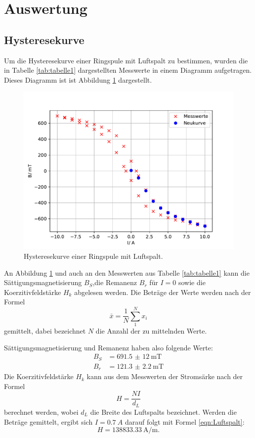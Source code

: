 \section{Auswertung}

\subsection{Hysteresekurve}
Um die Hysteresekurve einer Ringspule mit Luftspalt zu
bestimmen, wurden die in Tabelle \ref{tab:tabelle1}
dargestellten Messwerte in einem Diagramm aufgetragen.
Dieses Diagramm ist ist Abbildung \ref{fig:plothys}
dargestellt.

\begin{figure}
  \centering
  \includegraphics{plothys.pdf}
  \caption{Hysteresekurve einer Ringspule mit Luftspalt.}
  \label{fig:plothys}
\end{figure}
An Abbildung \ref{fig:plothys} und auch an den Messwerten
aus Tabelle \ref{tab:tabelle1} kann die
Sättigungsmagnetisierung $B_{S}$,die Remanenz
$B_{r}$ für $I=0$ sowie die Koerzitivfeldstärke
$H_{k}$ abgelesen werden.
Die Beträge der Werte werden nach der Formel
\begin{equation}
  \bar{x}=\frac{1}{N}\sum_{1}^N x_{i}
  \label{eqn:mittel}
\end{equation}
gemittelt, dabei bezeichnet $N$ die Anzahl der zu
mittelnden Werte.

Sättigungsmagnetisierung und Remanenz haben also folgende
Werte:
\begin{align*}
  B_{S} &=\SI{691,5(12)}{\milli\tesla} \\
  B_{r} &=\SI{121.3(22)}{\milli\tesla}
\end{align*}
Die Koerzitivfeldstärke $H_{k}$ kann aus dem Messwerten
der Stromsärke nach der Formel
\begin{equation}
  H=\frac{NI}{d_{L}}
  \label{eqn:Luftspalt}
\end{equation}
berechnet werden, wobei $d_{L}$ die Breite des Luftspalts
bezeichnet.
Werden die Beträge gemittelt, ergibt sich $I=\SI{0.7}{A}$
darauf folgt mit Formel \ref{eqn:Luftspalt}:
\begin{equation*}
  H=\SI{138833,33}{\ampere \per \meter}.
\end{equation*}

